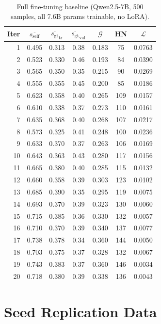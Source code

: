 \documentclass{article}
\newcommand{\gap}{\mathcal{G}}          %
\newcommand{\self}{s_{\text{self}}}     %
\newcommand{\gt}{s_{\text{gt}}}         %
\begin{document}
\begin{table}[h]
\centering
\caption{Full fine-tuning baseline (Qwen2.5-7B, 500 samples, all 7.6B params trainable, no LoRA).}
\label{tab:app-full-ft}
\small
\begin{tabular}{rcccccc}
\toprule
Iter & $\overline{\self}$ & $\overline{\gt}_\text{tr}$ & $\overline{\gt}_\text{val}$ & $\gap$ & HN & $\mathcal{L}$ \\
\midrule
1  & 0.495 & 0.313 & 0.38 & 0.183 & 75  & 0.0763 \\
2  & 0.523 & 0.330 & 0.46 & 0.193 & 84  & 0.0390 \\
3  & 0.565 & 0.350 & 0.35 & 0.215 & 90  & 0.0269 \\
4  & 0.555 & 0.355 & 0.45 & 0.200 & 85  & 0.0186 \\
5  & 0.623 & 0.358 & 0.40 & 0.265 & 109 & 0.0157 \\
6  & 0.610 & 0.338 & 0.37 & 0.273 & 110 & 0.0161 \\
7  & 0.635 & 0.368 & 0.40 & 0.268 & 107 & 0.0217 \\
8  & 0.573 & 0.325 & 0.41 & 0.248 & 100 & 0.0236 \\
9  & 0.633 & 0.370 & 0.37 & 0.263 & 106 & 0.0169 \\
10 & 0.643 & 0.363 & 0.43 & 0.280 & 117 & 0.0156 \\
11 & 0.665 & 0.380 & 0.40 & 0.285 & 115 & 0.0132 \\
12 & 0.660 & 0.358 & 0.39 & 0.303 & 123 & 0.0102 \\
13 & 0.685 & 0.390 & 0.35 & 0.295 & 119 & 0.0075 \\
14 & 0.693 & 0.370 & 0.39 & 0.323 & 130 & 0.0060 \\
15 & 0.715 & 0.385 & 0.36 & 0.330 & 132 & 0.0057 \\
16 & 0.710 & 0.370 & 0.39 & 0.340 & 137 & 0.0077 \\
17 & 0.738 & 0.378 & 0.34 & 0.360 & 144 & 0.0050 \\
18 & 0.703 & 0.375 & 0.37 & 0.328 & 132 & 0.0067 \\
19 & 0.743 & 0.383 & 0.37 & 0.360 & 146 & 0.0034 \\
20 & 0.718 & 0.380 & 0.39 & 0.338 & 136 & 0.0043 \\
\bottomrule
\end{tabular}
\end{table}

\section{Seed Replication Data}
\label{app:seed43}
\end{document}

